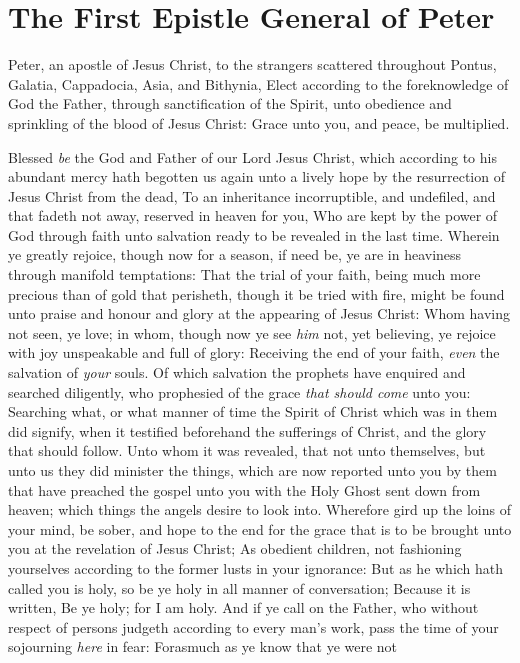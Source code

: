 \documentclass[11pt,letterpaper,oneside]{memoir}
\begin{document}
\chapter[1 Peter]{ The First Epistle General of Peter}
Peter, an apostle of Jesus Christ, to the strangers scattered throughout
Pontus, Galatia, Cappadocia, Asia, and Bithynia, Elect according to the
foreknowledge of God the Father, through sanctification of the Spirit,
unto obedience and sprinkling of the blood of Jesus Christ: Grace unto
you, and peace, be multiplied.

Blessed \emph{be} the God and Father of our Lord Jesus Christ, which
according to his abundant mercy hath begotten us again unto a lively
hope by the resurrection of Jesus Christ from the dead, To an
inheritance incorruptible, and undefiled, and that fadeth not away,
reserved in heaven for you, Who are kept by the power of God through
faith unto salvation ready to be revealed in the last time. Wherein ye
greatly rejoice, though now for a season, if need be, ye are in
heaviness through manifold temptations: That the trial of your faith,
being much more precious than of gold that perisheth, though it be tried
with fire, might be found unto praise and honour and glory at the
appearing of Jesus Christ: Whom having not seen, ye love; in whom,
though now ye see \emph{him} not, yet believing, ye rejoice with joy
unspeakable and full of glory: Receiving the end of your faith,
\emph{even} the salvation of \emph{your} souls. Of which salvation the
prophets have enquired and searched diligently, who prophesied of the
grace \emph{that should come} unto you: Searching what, or what manner
of time the Spirit of Christ which was in them did signify, when it
testified beforehand the sufferings of Christ, and the glory that should
follow. Unto whom it was revealed, that not unto themselves, but unto us
they did minister the things, which are now reported unto you by them
that have preached the gospel unto you with the Holy Ghost sent down
from heaven; which things the angels desire to look into. Wherefore gird
up the loins of your mind, be sober, and hope to the end for the grace
that is to be brought unto you at the revelation of Jesus Christ; As
obedient children, not fashioning yourselves according to the former
lusts in your ignorance: But as he which hath called you is holy, so be
ye holy in all manner of conversation; Because it is written, Be ye
holy; for I am holy. And if ye call on the Father, who without respect
of persons judgeth according to every man's work, pass the time of your
sojourning \emph{here} in fear: Forasmuch as ye know that ye were not
\end{document}
